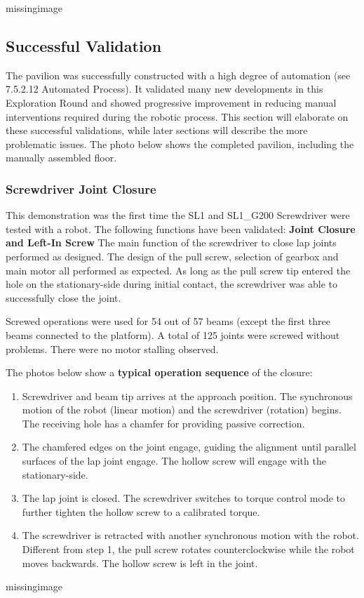 missingimage

\subsection{Successful Validation}
\label{subsection:exploration_4_successful_validation}

The pavilion was successfully constructed with a high degree of automation (see 7.5.2.12 Automated Process). It validated many new developments in this Exploration Round and showed progressive improvement in reducing manual interventions required during the robotic process. This section will elaborate on these successful validations, while later sections will describe the more problematic issues.
The photo below shows the completed pavilion, including the manually assembled floor.

\subsubsection{Screwdriver Joint Closure}
\label{subsubsection:exploration_4_screwdriver_joint_closure}

This demonstration was the first time the SL1 and SL1\_G200 Screwdriver were tested with a robot. The following functions have been validated:
\textbf{Joint Closure and Left-In Screw}
The main function of the screwdriver to close lap joints performed as designed. The design of the pull screw, selection of gearbox and main motor all performed as expected. As long as the pull screw tip entered the hole on the stationary-side during initial contact, the screwdriver was able to successfully close the joint. 

Screwed operations were used for 54 out of 57 beams (except the first three beams connected to the platform). A total of 125 joints were screwed without problems. There were no motor stalling observed.

The photos below show a \textbf{typical operation sequence }of the closure:
\begin{enumerate}
    \item Screwdriver and beam tip arrives at the approach position. The synchronous motion of the robot (linear motion) and the screwdriver (rotation) begins. The receiving hole has a chamfer for providing passive correction.
    \item The chamfered edges on the joint engage, guiding the alignment until parallel surfaces of the lap joint engage. The hollow screw will engage with the stationary-side.
    \item The lap joint is closed. The screwdriver switches to torque control mode to further tighten the hollow screw to a calibrated torque.
    \item The screwdriver is retracted with another synchronous motion with the robot. Different from step 1, the pull screw rotates counterclockwise while the robot moves backwards. The hollow screw is left in the joint.
\end{enumerate}
missingimage

